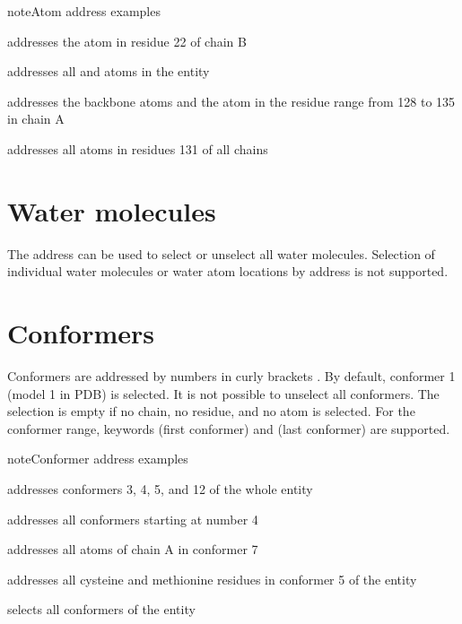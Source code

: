 \documentclass[letterpaper,10pt,english]{sphinxmanual}
\begin{document}
\begin{sphinxadmonition}{note}{Atom address examples}

  addresses the  atom in residue 22 of chain B

 addresses all  and  atoms in the entity

 addresses the backbone atoms and the  atom in the residue range from 128 to 135 in chain A

 addresses all atoms in residues 131 of all chains
\end{sphinxadmonition}


\section{Water molecules}
\label{\detokenize{MMMx_addresses:water-molecules}}
The address  can be used to select or unselect all water molecules. Selection of individual water molecules or water atom locations by address is not supported.


\section{Conformers}
\label{\detokenize{MMMx_addresses:conformers}}
Conformers are addressed by numbers in curly brackets \sphinxcode{\sphinxupquote{\{\}}}. By default, conformer 1 (model 1 in PDB) is selected. It is not possible to unselect all conformers.
The selection is empty if no chain, no residue, and no atom is selected. For the conformer range, keywords  (first conformer) and  (last conformer) are supported.

\begin{sphinxadmonition}{note}{Conformer address examples}

  addresses conformers 3, 4, 5, and 12 of the whole entity

 addresses all conformers starting at number 4

 addresses all  atoms of chain A in conformer 7

 addresses all cysteine and methionine residues in conformer 5 of the entity

\sphinxcode{\sphinxupquote{\{*\}}} selects all conformers of the entity
\end{sphinxadmonition}
\end{document}
